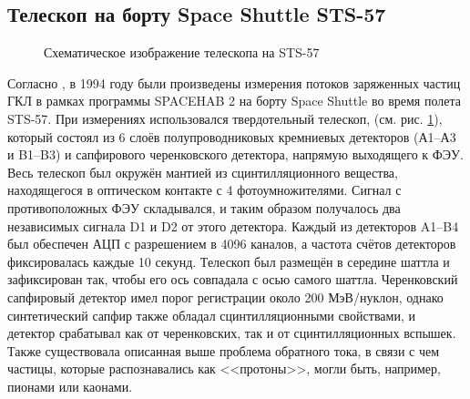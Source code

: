 \documentclass[12pt,a4paper]{report} %
\begin{document}
\subsection{Телескоп на борту Space Shuttle STS-57}
\begin{figure}
	\noindent{}
	\caption{Схематическое изображение телескопа на STS-57}
	\label{figSTS57}
\end{figure}
Согласно \cite{ShuttleSTS57}, в 1994 году были произведены измерения потоков заряженных частиц ГКЛ в рамках программы SPACEHAB 2 на борту Space Shuttle во время полета STS-57. При измерениях использовался твердотельный телескоп, (см. рис. \ref{figSTS57}), который состоял из 6 слоёв полупроводниковых кремниевых детекторов (А1–А3 и B1–B3) и сапфирового черенковского детектора, напрямую выходящего к ФЭУ. Весь телескоп был окружён мантией из сцинтилляционного вещества, находящегося в оптическом контакте с 4 фотоумножителями. Сигнал с противоположных ФЭУ складывался, и таким образом получалось два независимых сигнала D1 и D2 от этого детектора. Каждый из детекторов A1–B4 был обеспечен АЦП с разрешением в 4096 каналов, а частота счётов детекторов фиксировалась каждые 10 секунд. Телескоп был размещён в середине шаттла и зафиксирован так, чтобы его ось совпадала с осью самого шаттла. Черенковский сапфировый детектор имел порог регистрации около 200 МэВ/нуклон, однако синтетический сапфир также обладал сцинтилляционными свойствами, и детектор срабатывал как от черенковских, так и от сцинтилляционных вспышек. Также существовала описанная выше проблема обратного тока, в связи с чем частицы, которые распознавались как <<протоны>>, могли быть, например, пионами или каонами. 
\end{document}
